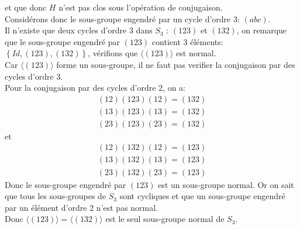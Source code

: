\documentclass[11pt, a4paper, twoside]{article}
\begin{document}
et que donc $H$ n'est pas clos sous l'opération de conjugaison.\\
Considérons donc le sous-groupe engendré par un cycle d'ordre 3: $( abc) $.\\
Il n'existe que deux cycles d'ordre 3 dans $S_3$ : $( 123) $ et $( 132) $, on remarque que le sous-groupe engendré par $( 123) $ contient 3 éléments: $ \left\{ Id, ( 123) ,( 132)\right\} $, vérifions que $\langle ( 123) \rangle$ est normal.\\
Car $ \langle( 123) \rangle$ forme un sous-groupe, il ne faut pas verifier la conjugaison par des cycles d'ordre 3.\\
Pour la conjugaison par des cycles d'ordre 2, on a:
\begin{align*}
	( 12) ( 123) ( 12) = ( 132) \\
	( 13) ( 123) ( 13) = ( 132) \\
	( 23) ( 123) ( 23) = ( 132)
\end{align*}
et
\begin{align*}
	( 12) ( 132) ( 12) = ( 123) \\
	( 13) ( 132) ( 13) = ( 123) \\
	( 23) ( 132) ( 23) = ( 123)
\end{align*}
Donc le sous-groupe engendré par $( 123) $ est un sous-groupe normal. Or on sait que tous les sous-groupes de $S_3$ sont cycliques et que un sous-groupe engendré par un élément d'ordre 2 n'est pas normal.\\
Donc $\langle ( 123) \rangle = \langle ( 132) \rangle$ est le seul sous-groupe normal de $S_3$.\\
\end{document}
